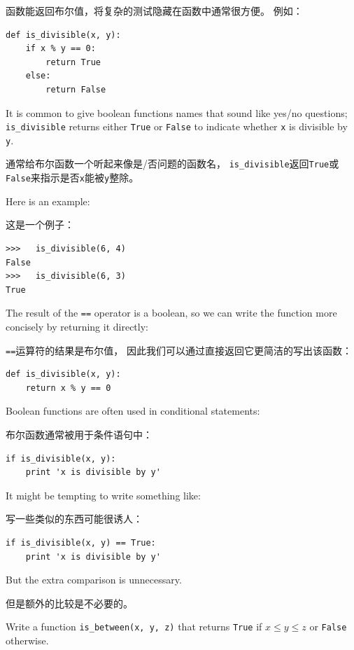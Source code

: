\documentclass[10pt]{book}
\begin{document}
\begin{CJK}{UTF8}{gbsn}
函数能返回布尔值，将复杂的测试隐藏在函数中通常很方便。
例如：

\begin{verbatim}
def is_divisible(x, y):
    if x % y == 0:
        return True
    else:
        return False
\end{verbatim}
%
It is common to give boolean functions names that sound like yes/no
questions; \verb"is_divisible" returns either {\tt True} or {\tt False}
to indicate whether {\tt x} is divisible by {\tt y}.

通常给布尔函数一个听起来像是/否问题的函数名，
\verb"is_divisible"返回{\tt True}或{\tt False}来指示是否{\tt x}能被{\tt y}整除。

Here is an example:

这是一个例子：

\begin{verbatim}
>>>   is_divisible(6, 4)
False
>>>   is_divisible(6, 3)
True
\end{verbatim}
%
The result of the {\tt ==} operator is a boolean, so we can write the
function more concisely by returning it directly:

{\tt ==}运算符的结果是布尔值，
因此我们可以通过直接返回它更简洁的写出该函数：

\begin{verbatim}
def is_divisible(x, y):
    return x % y == 0
\end{verbatim}
%
Boolean functions are often used in conditional statements:

布尔函数通常被用于条件语句中：

\begin{verbatim}
if is_divisible(x, y):
    print 'x is divisible by y'
\end{verbatim}
%
It might be tempting to write something like:

写一些类似的东西可能很诱人：

\begin{verbatim}
if is_divisible(x, y) == True:
    print 'x is divisible by y'
\end{verbatim}
%
But the extra comparison is unnecessary.

但是额外的比较是不必要的。

\begin{exercise}

Write a function \verb"is_between(x, y, z)" that
returns {\tt True} if $x \le y \le z$ or {\tt False} otherwise.

\end{exercise}



\end{CJK}
\end{document}
